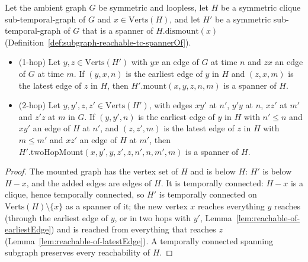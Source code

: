 \begin{theorem}
  \label{thm:dismountability}
  \leanok
  Let the ambient graph $G$ be symmetric and loopless, let $H$ be a symmetric
  clique sub-temporal-graph of $G$ and $x \in \mathrm{Verts}(H)$, and let $H'$
  be a symmetric sub-temporal-graph of $G$ that is a spanner of
  $H.\mathrm{dismount}(x)$ (Definition~\ref{def:subgraph-reachable-tc-spannerOf}).
  \begin{itemize}
    \item (1-hop) Let $y, z \in \mathrm{Verts}(H')$ with $yx$ an edge of $G$ at
      time $n$ and $zx$ an edge of $G$ at time $m$. If $(y,x,n)$ is the
      earliest edge of $y$ in $H$ and $(z,x,m)$ is the latest edge of $z$ in
      $H$, then $H'.\mathrm{mount}(x,y,z,n,m)$ is a spanner of $H$.
    \item ($2$-hop) Let $y, y', z, z' \in \mathrm{Verts}(H')$, with edges
      $xy'$ at $n'$, $y'y$ at $n$, $xz'$ at $m'$ and $z'z$ at $m$ in $G$. If
      $(y,y',n)$ is the earliest edge of $y$ in $H$ with $n' \le n$ and $xy'$
      an edge of $H$ at $n'$, and $(z,z',m)$ is the latest edge of $z$ in $H$
      with $m \le m'$ and $xz'$ an edge of $H$ at $m'$, then
      $H'.\mathrm{twoHopMount}(x,y',y,z',z,n',n,m',m)$ is a spanner of $H$.
  \end{itemize}
\end{theorem}

\begin{proof}
  \leanok
  The mounted graph has the vertex set of $H$ and is below $H$: $H'$ is below
  $H - x$, and the added edges are edges of $H$. It is temporally connected:
  $H - x$ is a clique, hence temporally connected, so $H'$ is temporally
  connected on $\mathrm{Verts}(H) \setminus \{x\}$ as a spanner of it; the new
  vertex $x$ reaches everything $y$ reaches (through the earliest edge of $y$,
  or in two hops with $y'$, Lemma~\ref{lem:reachable-of-earliestEdge}) and is
  reached from everything that reaches $z$ (Lemma~\ref{lem:reachable-of-latestEdge}).
  A temporally connected spanning subgraph preserves every reachability of $H$.
\end{proof}

